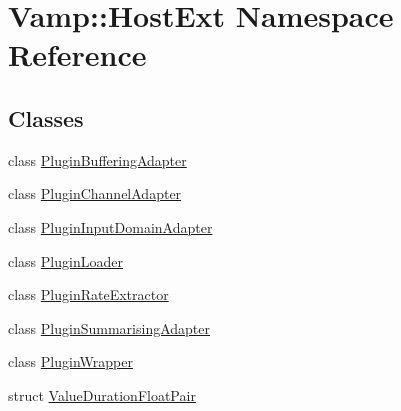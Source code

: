 \hypertarget{namespace_vamp_1_1_host_ext}{}\section{Vamp\+:\+:Host\+Ext Namespace Reference}
\label{namespace_vamp_1_1_host_ext}
\subsection*{Classes}
\begin{DoxyCompactItemize}
\item 
class \hyperlink{class_vamp_1_1_host_ext_1_1_plugin_buffering_adapter}{Plugin\+Buffering\+Adapter}
\item 
class \hyperlink{class_vamp_1_1_host_ext_1_1_plugin_channel_adapter}{Plugin\+Channel\+Adapter}
\item 
class \hyperlink{class_vamp_1_1_host_ext_1_1_plugin_input_domain_adapter}{Plugin\+Input\+Domain\+Adapter}
\item 
class \hyperlink{class_vamp_1_1_host_ext_1_1_plugin_loader}{Plugin\+Loader}
\item 
class \hyperlink{class_vamp_1_1_host_ext_1_1_plugin_rate_extractor}{Plugin\+Rate\+Extractor}
\item 
class \hyperlink{class_vamp_1_1_host_ext_1_1_plugin_summarising_adapter}{Plugin\+Summarising\+Adapter}
\item 
class \hyperlink{class_vamp_1_1_host_ext_1_1_plugin_wrapper}{Plugin\+Wrapper}
\item 
struct \hyperlink{struct_vamp_1_1_host_ext_1_1_value_duration_float_pair}{Value\+Duration\+Float\+Pair}
\end{DoxyCompactItemize}
